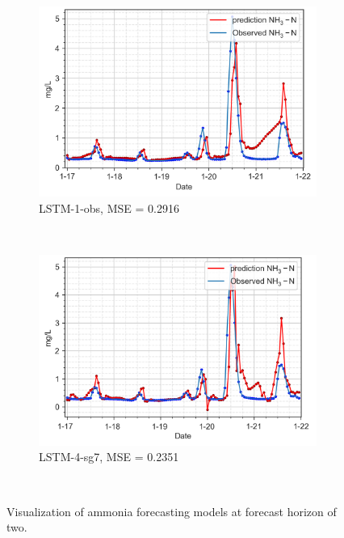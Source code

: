 \begin{figure}[!ht]
  \centering
  \begin{subfigure}[t]{0.75\textwidth}
    \includegraphics[width=\linewidth]{imgs/results/steps/nh3-lstm-1-fc2.png}
    \caption{LSTM-1-obs, MSE = 0.2916} \label{fig:nh3-lstm-1-fc2}
  \end{subfigure}\\
  \vspace{2em}
  \begin{subfigure}[t]{0.75\textwidth}
    \includegraphics[width=\linewidth]{imgs/results/steps/nh3-lstm-4-fc2.png}
    \caption{LSTM-4-sg7, MSE = 0.2351} \label{fig:nh3-lstm-4-fc2}
  \end{subfigure}\\
\caption{Visualization of ammonia forecasting models at forecast horizon of two.} \label{fig:nh3-forecast-fc2}
\end{figure}

